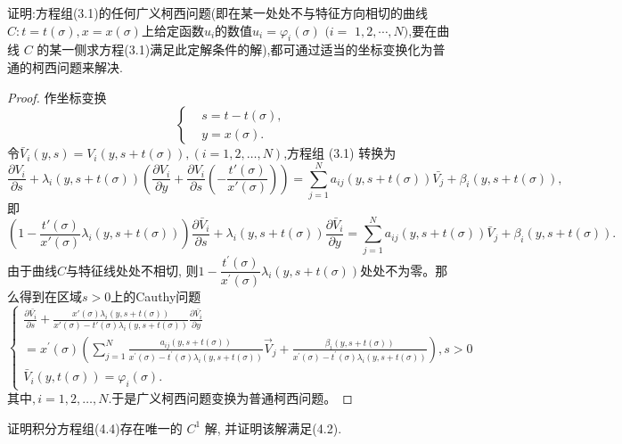 \begin{exercise}
	证明:方程组(3.1)的任何广义柯西问题(即在某一处处不与特征方向相切的曲线$C:t=t(\sigma),x=x(\sigma)$上给定函数$u_i$的数值$u_i=\varphi_i(\sigma)$ $(i=$ $1,2,\cdots,N)$,要在曲线 $C$ 的某一侧求方程(3.1)满足此定解条件的解),都可通过适当的坐标变换化为普通的柯西问题来解决.
\end{exercise}

\begin{proof}
	作坐标变换
	$$\begin{cases}&s=t-t(\sigma),\\&y=x(\sigma).\end{cases}$$
	令$\bar{V}_i(y,s)=V_i(y,s+t(\sigma)),(i=1,2,\ldots,N)$,方程组 (3.1) 转换为
	$$\frac{\partial V_{i}}{\partial s}+\lambda_{i}(y,s+t(\sigma))\left(\frac{\partial V_{i}}{\partial y}+\frac{\partial V_{i}}{\partial s}\left(-\frac{t'(\sigma)}{x'(\sigma)}\right)\right)=\sum_{j=1}^{N}a_{ij}(y,s+t(\sigma))\bar{V_{j}}+\beta_{i}(y,s+t(\sigma)),$$
	即
	$$\left(1-\frac{t'(\sigma)}{x'(\sigma)}\lambda_{i}(y,s+t(\sigma))\right)\frac{\partial\bar{V}_{i}}{\partial s}+\lambda_{i}(y,s+t(\sigma))\frac{\partial\bar{V}_{i}}{\partial y}=\sum_{j=1}^{N}a_{ij}(y,s+t(\sigma))\bar{V}_{j}+\beta_{i}(y,s+t(\sigma)).$$
	由于曲线$C$与特征线处处不相切, 则$1-\dfrac{t^{\prime}(\sigma)}{x^{\prime}(\sigma)}\lambda_{i}(y,s+t(\sigma))$处处不为零。那么得到在区域$s>0$上的Cauthy问题
	$$\begin{cases}
		\displaystyle\frac{\partial\bar{V_i}}{\partial s}+\frac{x'(\sigma)\lambda_i(y,s+t(\sigma))}{x'(\sigma)-t'(\sigma)\lambda_i(y,s+t(\sigma))}\frac{\partial\bar{V_i}}{\partial y}\\
		=\displaystyle x^{\prime}(\sigma)\left(\sum_{j=1}^{N}\frac{a_{ij}(y,s+t(\sigma))}{x^{\prime}(\sigma)-t^{\prime}(\sigma)\lambda_{i}(y,s+t(\sigma))}\vec{V}_{j}+\frac{\beta_{i}(y,s+t(\sigma))}{x^{\prime}(\sigma)-t^{\prime}(\sigma)\lambda_{i}(y,s+t(\sigma))}\right),s>0\\
		\bar{V}_{i}(y,t(\sigma))=\varphi_{i}(\sigma).
	\end{cases}$$
	其中$,i=1,2,\ldots,N.$于是广义柯西问题变换为普通柯西问题。
\end{proof}

\begin{exercise}
	证明积分方程组(4.4)存在唯一的 $C^1$ 解, 并证明该解满足(4.2).
\end{exercise}

